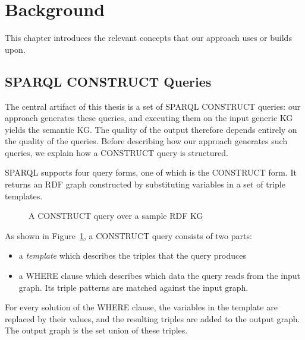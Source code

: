 \section{Background}\label{sec:background}

This chapter introduces the relevant concepts that our approach uses or builds upon. 

\subsection{SPARQL CONSTRUCT Queries}
\label{sec:bg-construct}
The central artifact of this thesis is a set of SPARQL CONSTRUCT queries: our approach generates these queries, and executing them on the input generic KG yields the semantic KG\@. The quality of the output therefore depends entirely on the quality of the queries. Before describing how our approach generates such queries, we explain how a CONSTRUCT query is structured.

SPARQL \citep{world2013sparql} supports four query forms, one of which is the CONSTRUCT form. It returns an RDF graph constructed by substituting variables in a set of triple templates.

\begin{figure}[!htbp]
  \centering
  
  \caption{A CONSTRUCT query over a sample RDF KG}
  \label{fig:construct-anatomy}
\end{figure}
\FloatBarrier

As shown in Figure~\ref{fig:construct-anatomy}, a CONSTRUCT query consists of two parts:
\begin{itemize}
  \item a \emph{template} which describes the triples that the query produces 
  \item a WHERE clause which describes which data the query reads from the input graph. Its triple patterns are matched against the input graph.
\end{itemize}


For every solution of the WHERE clause, the variables in the template are replaced by their values, and the resulting triples are added to the output graph. The output graph is the set union of these triples. 


